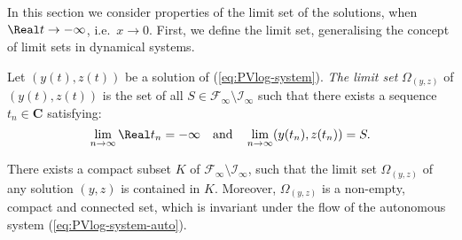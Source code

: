In this section we consider properties of the limit set of the solutions, when $\Real t\to-\infty$, i.e.~$x\to0$.
First, we define the limit set, generalising the concept of limit sets in dynamical systems.

\begin{definition}
Let $(y(t),z(t))$ be a solution of (\ref{eq:PVlog-system}). \emph{The limit set} $\Omega_{(y,z)}$ of $(y(t),z(t))$ is the set of all $S\in\mathcal{F}_{\infty}\setminus\mathcal{I}_{\infty}$ such that there exists a sequence $t_n\in\mathbf{C}$ satisfying:
$$
\lim_{n\to\infty}\Real t_n=-\infty
\quad\text{and}\quad
\lim_{n\to\infty}(y(t_n),z(t_n))=S.
$$
\end{definition}



\begin{theorem}\label{th:limit}
There exists a compact subset $K$ of $\mathcal{F}_{\infty}\setminus\mathcal{I}_{\infty}$, such that the limit set $\Omega_{(y,z)}$ of any solution $(y,z)$ is contained in $K$.
Moreover, $\Omega_{(y,z)}$ is a non-empty, compact and connected set, which is invariant under the flow of the autonomous system (\ref{eq:PVlog-system-auto}).
\end{theorem}

